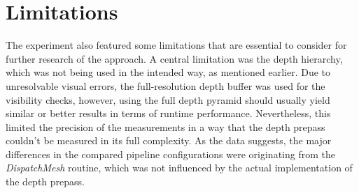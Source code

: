 










\section{Limitations}

The experiment also featured some limitations that are essential to consider for further research of the approach.
A central limitation was the depth hierarchy, which was not being used in the intended way, as mentioned earlier.
Due to unresolvable visual errors, the full-resolution depth buffer was used for the visibility checks, however, 
using the full depth pyramid should usually yield similar or better results in terms of runtime performance. 
Nevertheless, this limited the precision of the measurements in a way that the depth prepass couldn't be measured 
in its full complexity. As the data suggests, the major differences in the compared pipeline configurations were 
originating from the \emph{DispatchMesh} routine, which was not influenced by the actual implementation of the 
depth prepass. \\

